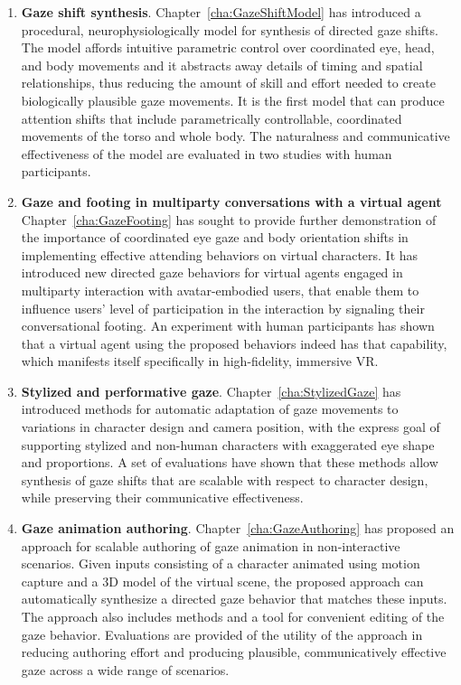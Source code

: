 \begin{enumerate}
\item \textbf{Gaze shift synthesis}. Chapter~\ref{cha:GazeShiftModel} has introduced a procedural, neurophysiologically model for synthesis of directed gaze shifts. The model affords intuitive parametric control over coordinated eye, head, and body movements and it abstracts away details of timing and spatial relationships, thus reducing the amount of skill and effort needed to create biologically plausible gaze movements. It is the first model that can produce attention shifts that include parametrically controllable, coordinated movements of the torso and whole body. The naturalness and communicative effectiveness of the model are evaluated in two studies with human participants.
\item \textbf{Gaze and footing in multiparty conversations with a virtual agent} Chapter~\ref{cha:GazeFooting} has sought to provide further demonstration of the importance of coordinated eye gaze and body orientation shifts in implementing effective attending behaviors on virtual characters. It has introduced new directed gaze behaviors for virtual agents engaged in multiparty interaction with avatar-embodied users, that enable them to influence users' level of participation in the interaction by signaling their conversational footing. An experiment with human participants has shown that a virtual agent using the proposed behaviors indeed has that capability, which manifests itself specifically in high-fidelity, immersive VR.
\item \textbf{Stylized and performative gaze}. Chapter~\ref{cha:StylizedGaze} has introduced methods for automatic adaptation of gaze movements to variations in character design and camera position, with the express goal of supporting stylized and non-human characters with exaggerated eye shape and proportions. A set of evaluations have shown that these methods allow synthesis of gaze shifts that are scalable with respect to character design, while preserving their communicative effectiveness.
\item \textbf{Gaze animation authoring}. Chapter~\ref{cha:GazeAuthoring} has proposed an approach for scalable authoring of gaze animation in non-interactive scenarios. Given inputs consisting of a character animated using motion capture and a 3D model of the virtual scene, the proposed approach can automatically synthesize a directed gaze behavior that matches these inputs. The approach also includes methods and a tool for convenient editing of the gaze behavior. Evaluations are provided of the utility of the approach in reducing authoring effort and producing plausible, communicatively effective gaze across a wide range of scenarios.
\end{enumerate}

